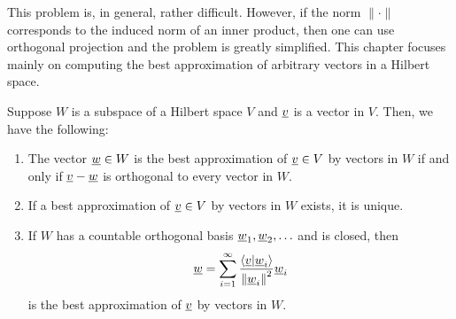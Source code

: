 This problem is, in general, rather difficult.
However, if the norm $\| \cdot \|$ corresponds to the induced norm of an inner product, then one can use orthogonal projection and the problem is greatly simplified.
This chapter focuses mainly on computing the best approximation of arbitrary vectors in a Hilbert space.
\begin{theorem} \label{theorem:OrthogonalProjection}
Suppose $W$ is a subspace of a Hilbert space $V$ and $\underline{v}$ is a vector in $V$.
Then, we have the following:
\begin{enumerate}
\item The vector $\underline{w} \in W$ is the best approximation of $\underline{v} \in V$ by vectors in $W$ if and only if $\underline{v} - \underline{w}$ is orthogonal to every vector in $W$.
\item If a best approximation of $\underline{v} \in V$ by vectors in $W$ exists, it is unique.
\item If $W$ has a countable orthogonal basis $\underline{w}_1, \underline{w}_2, \ldots$ and is closed, then
\begin{equation}
\label{equation:OrthogonalProjectionOrthogonalVectors}
\underline{w} = \sum_{i=1}^\infty \frac{ \left\langle \underline{v} | \underline{w}_i \right\rangle }{ \left\| \underline{w}_i \right\|^2 } \underline{w}_i
\end{equation}
is the best approximation of $\underline{v}$ by vectors in $W$.
\end{enumerate}
\end{theorem}

